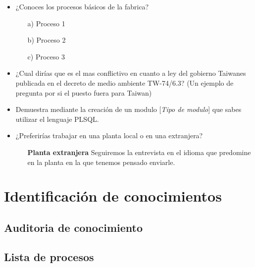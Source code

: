 \documentclass[a4paper]{article}
\begin{document}
\begin{itemize}
	\item ¿Conoces los procesos básicos de la fabrica?
	\begin{itemize}
		\item[a)] Proceso 1
		\item[b)] Proceso 2
		\item[c)] Proceso 3
	\end{itemize}
	
	\item ¿Cual dirías que es el mas conflictivo en cuanto a ley del gobierno Taiwanes publicada en el decreto de medio ambiente TW-74/6.3? (Un ejemplo de pregunta por si el puesto fuera para Taiwan)
	\item Demuestra mediante la creación de un modulo  [\textit{Tipo de modulo}] que sabes utilizar el lenguaje PLSQL.
	\item ¿Preferirías trabajar en una planta local o en una extranjera?
	\begin{itemize}
		\item[\textbf{Planta extranjera}] Seguiremos la entrevista en el idioma que predomine en la planta en la que tenemos pensado enviarle.
	\end{itemize}
\end{itemize}



\section{Identificación de conocimientos}

\subsection{Auditoria de conocimiento}


\subsection{Lista de procesos}
\end{document}
